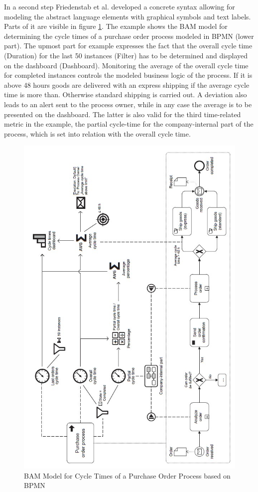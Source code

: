 In a second step Friedenstab et al. developed a concrete syntax allowing for modeling the abstract language elements with graphical symbols and text labels. Parts of it are visible in figure \ref{fig:Model-Cycle-Times}. The example shows the BAM model for determining the cycle times of a purchase order process modeled in BPMN (lower part). The upmost part for example expresses the fact that the overall cycle time (Duration) for the last 50 instances (Filter) has to be determined and displayed on the dashboard (Dashboard). Monitoring the average of the overall cycle time for completed instances controls the modeled business logic of the process. If it is above 48 hours goods are delivered with an express shipping if the average cycle time is more than. Otherwise standard shipping is carried out. A deviation also leads to an alert sent to the process owner, while in any case the average is to be presented on the dashboard. The latter is also valid for the third time-related metric in the example, the partial cycle-time for the company-internal part of the process, which is set into relation with the overall cycle time.

\begin{figure}[h]
	\centering
	\includegraphics[width=0.9\linewidth]{Figures/Chapter5/Monitoring/BAM Model for Cycle Times.jpg}
	\caption[BAM Model for Cycle Times of a Purchase Order Process based on BPMN 12]{BAM Model for Cycle Times of a Purchase Order Process based on BPMN \cite{article:BPMNActivityMon}}
	\label{fig:Model-Cycle-Times}
\end{figure}


